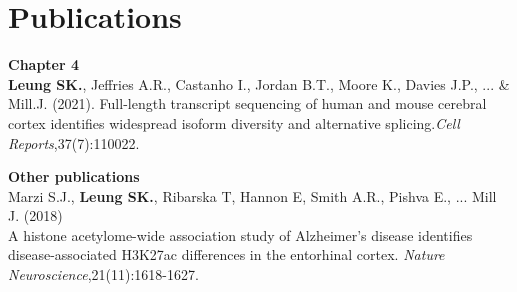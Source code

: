 \chapter*{Publications}

\textbf{Chapter 4} \\
\textbf{Leung SK.}, Jeffries A.R., Castanho I., Jordan B.T., Moore K., Davies J.P., ... \& Mill.J. (2021). Full-length transcript sequencing of human and mouse cerebral cortex identifies widespread isoform diversity and alternative splicing.\textit{Cell Reports},37(7):110022.

\textbf{Other publications} \\
Marzi S.J., \textbf{Leung SK.}, Ribarska T, Hannon E, Smith A.R., Pishva E., ... Mill J. (2018) \\ A histone acetylome-wide association study of Alzheimer's disease identifies disease-associated H3K27ac differences in the entorhinal cortex. \textit{Nature Neuroscience},21(11):1618-1627.
